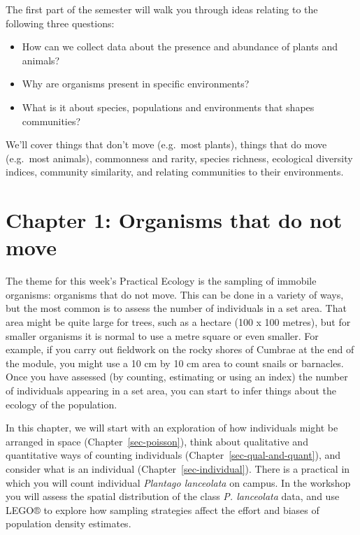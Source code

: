 \documentclass[
  letterpaper,
  DIV=11,
  numbers=noendperiod]{scrreprt}
\providecommand{\tightlist}{%
  \setlength{\itemsep}{0pt}\setlength{\parskip}{0pt}}
\begin{document}
The first part of the semester will walk you through ideas relating to
the following three questions:

\begin{itemize}
\tightlist
\item
  How can we collect data about the presence and abundance of plants and
  animals?
\item
  Why are organisms present in specific environments?
\item
  What is it about species, populations and environments that shapes
  communities?
\end{itemize}

We'll cover things that don't move (e.g.~most plants), things that do
move (e.g.~most animals), commonness and rarity, species richness,
ecological diversity indices, community similarity, and relating
communities to their environments.

\part{Chapter 1: Organisms that do not move}

The theme for this week's Practical Ecology is the sampling of immobile
organisms: organisms that do not move. This can be done in a variety of
ways, but the most common is to assess the number of individuals in a
set area. That area might be quite large for trees, such as a hectare
(100 x 100 metres), but for smaller organisms it is normal to use a
metre square or even smaller. For example, if you carry out fieldwork on
the rocky shores of Cumbrae at the end of the module, you might use a 10
cm by 10 cm area to count snails or barnacles. Once you have assessed
(by counting, estimating or using an index) the number of individuals
appearing in a set area, you can start to infer things about the ecology
of the population.

In this chapter, we will start with an exploration of how individuals
might be arranged in space (Chapter~\ref{sec-poisson}), think about
qualitative and quantitative ways of counting individuals
(Chapter~\ref{sec-qual-and-quant}), and consider what is an individual
(Chapter~\ref{sec-individual}). There is a practical in which you will
count individual \emph{Plantago lanceolata} on campus. In the workshop
you will assess the spatial distribution of the class \emph{P.
lanceolata} data, and use LEGO® to explore how sampling strategies
affect the effort and biases of population density estimates.
\end{document}
